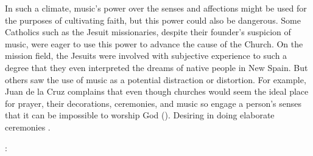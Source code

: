 In such a climate, music's power over the senses and affections might be used for the purposes of cultivating faith, but this power could also be dangerous.
Some Catholics such as the Jesuit missionaries, despite their founder's suspicion of music, were eager to use this power to advance the cause of the Church.
On the mission field, the Jesuits were involved with subjective experience to such a degree that they even interpreted the dreams of native people in New Spain.%
    \Autocite[\XXX]{Bailey:Art}
But others saw the use of music as a potential distraction or distortion.
For example, Juan de la Cruz complains that even though churches would seem the ideal place for prayer, their decorations, ceremonies, and music so engage a person's senses that it can be impossible to worship God  ().%
    \Autocite[bk.~3, ch.~39--45, 415--424]{JuandelaCruz:Subida}
Desiring  in doing elaborate ceremonies .%
\begin{Footnote}
    \Autocite[bk.~3, ch.~43, 420]{JuandelaCruz:Subida}: 
\end{Footnote}


